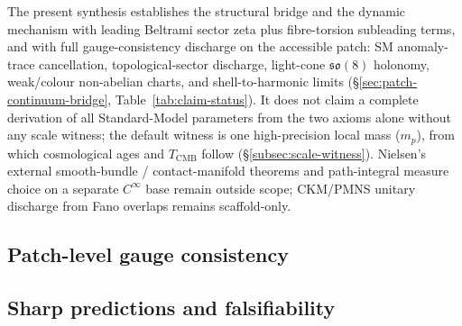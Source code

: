 \documentclass[11pt]{amsart}
\newcommand{\leanid}[1]{{\footnotesize\path{#1}}}
\begin{document}
The present synthesis establishes the structural bridge and the dynamic mechanism with leading Beltrami sector zeta plus fibre-torsion subleading terms, and with full gauge-consistency discharge on the accessible patch: SM anomaly-trace cancellation, topological-sector discharge, light-cone $\mathfrak{so}(8)$ holonomy, weak/colour non-abelian charts, and shell-to-harmonic limits (§\ref{sec:patch-continuum-bridge}, Table~\ref{tab:claim-status}). It does not claim a complete derivation of all Standard-Model parameters from the two axioms alone without any scale witness; the default witness is one high-precision local mass ($m_p$), from which cosmological ages and $T_{\mathrm{CMB}}$ follow (\S\ref{subsec:scale-witness}). Nielsen's external smooth-bundle / contact-manifold theorems and path-integral measure choice on a separate $C^\infty$ base remain outside scope; CKM/PMNS unitary discharge from Fano overlaps remains scaffold-only.

\subsection{Patch-level gauge consistency}
\label{subsec:patch-gauge-consistency}

\renewcommand{\leanCertAnomaly}{; machine-checked in \hyperref[lean:anomaly-cancellation]{Anomaly cancellation} (\leanid{sm_anomaly_free_three_generations}).}
\renewcommand{\leanCertTopology}{; discharged in \hyperref[lean:patch-topology]{Patch topology discharge} (\leanid{patchTopologicalObstructionsDischarged}).}
\renewcommand{\leanCertStrongColor}{; optional certificate in \hyperref[lean:strong-color-su3]{Strong-color SU(3) chart}.}



\subsection{Sharp predictions and falsifiability}
\label{sec:falsifiability}
\end{document}
